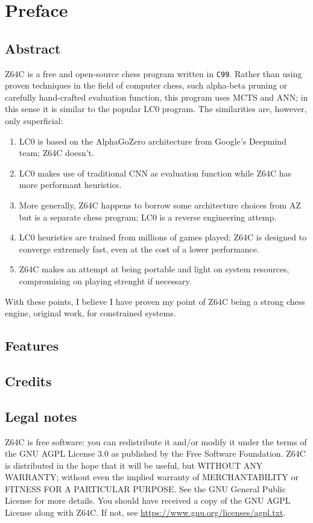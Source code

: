 \chapter{Preface}

\section{Abstract}
Z64C is a free and open-source chess program written in \texttt{C99}. Rather
than using proven techniques in the field of computer chess, such alpha-beta
pruning or carefully hand-crafted evaluation function, this program uses MCTS
and ANN; in this sense it is similar to the popular LC0 program. The
similarities are, however, only superficial:

\begin{enumerate}
\item LC0 is based on the AlphaGoZero architecture from Google's Deepmind team;
Z64C doesn't.
\item LC0 makes use of traditional CNN as evaluation function while Z64C has
more performant heuristics.
\item More generally, Z64C happens to borrow some architecture choices from AZ
but is a separate chess program; LC0 is a reverse engineering attemp.
\item LC0 heuristics are trained from millions of games played; Z64C is designed
to converge extremely fast, even at the cost of a lower performance.
\item Z64C makes an attempt at being portable and light on system resources,
compromising on playing strenght if necessary.
\end{enumerate}

With these points, I believe I have proven my point of Z64C being a strong chess
engine, original work, for constrained systems.

\section{Features}

\section{Credits}

\section{Legal notes}

Z64C is free software: you can redistribute it and/or modify
it under the terms of the GNU AGPL
License 3.0 as published by
the Free Software Foundation. Z64C is distributed in the hope that it will be useful,
but WITHOUT ANY WARRANTY; without even the implied warranty of
MERCHANTABILITY or FITNESS FOR A PARTICULAR PURPOSE.  See the
GNU General Public License for more details. You should have received a copy of the GNU AGPL License
along with Z64C.  If not, see \url{https://www.gnu.org/licenses/agpl.txt}.

